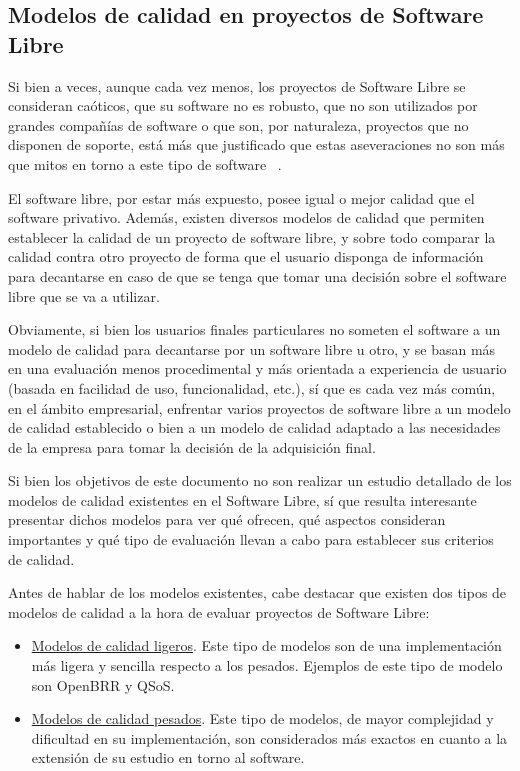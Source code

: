 \documentclass[11pt]{article}
\begin{document}
\subsection{Modelos de calidad en proyectos de Software Libre}

Si bien a veces, aunque cada vez menos, los proyectos de Software Libre se consideran caóticos, que su software no es robusto, que no son utilizados por grandes compañías de software o que son, por naturaleza, proyectos que no disponen de soporte, está más que justificado que estas aseveraciones no son más que mitos en torno a este tipo de software ~\cite{oreilly:tenmythsaboutopensourcesoftware}.

El software libre, por estar más expuesto, posee igual o mejor calidad que el software privativo. Además, existen diversos modelos de calidad que permiten establecer la calidad de un proyecto de software libre, y sobre todo comparar la calidad contra otro proyecto de forma que el usuario disponga de información para decantarse en caso de que se tenga que tomar una decisión sobre el software libre que se va a utilizar.

Obviamente, si bien los usuarios finales particulares no someten el software a un modelo de calidad para decantarse por un software libre u otro, y se basan más en una evaluación menos procedimental y más orientada a experiencia de usuario (basada en facilidad de uso, funcionalidad, etc.), sí que es cada vez más común, en el ámbito empresarial, enfrentar varios proyectos de software libre a un modelo de calidad establecido o bien a un modelo de calidad adaptado a las necesidades de la empresa para tomar la decisión de la adquisición final.

Si bien los objetivos de este documento no son realizar un estudio detallado de los modelos de calidad existentes en el Software Libre, sí que resulta interesante presentar dichos modelos para ver qué ofrecen, qué aspectos consideran importantes y qué tipo de evaluación llevan a cabo para establecer sus criterios de calidad.

Antes de hablar de los modelos existentes, cabe destacar que existen dos tipos de modelos de calidad a la hora de evaluar proyectos de Software Libre:

\begin{itemize}
\item{\underline{Modelos de calidad ligeros}}. Este tipo de modelos son de una implementación más ligera y sencilla respecto a los pesados. Ejemplos de este tipo de modelo son OpenBRR y QSoS.
\item{\underline{Modelos de calidad pesados}}. Este tipo de modelos, de mayor complejidad y dificultad en su implementación, son considerados más exactos en cuanto a la extensión de su estudio en torno al software.
\end{itemize}
\end{document}
